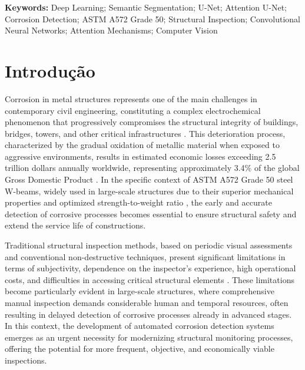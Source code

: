 \documentclass[12pt,a4paper,twoside]{article}
\begin{document}
\vspace{1em}

\noindent \textbf{Keywords:} Deep Learning; Semantic Segmentation; U-Net; Attention U-Net; Corrosion Detection; ASTM A572 Grade 50; Structural Inspection; Convolutional Neural Networks; Attention Mechanisms; Computer Vision

\vspace{2em}

\newpage


\section{Introdução}
\label{sec:introducao}

Corrosion in metal structures represents one of the main challenges in contemporary civil engineering, constituting a complex electrochemical phenomenon that progressively compromises the structural integrity of buildings, bridges, towers, and other critical infrastructures \cite{fontana2005corrosion, revie2011uhlig}. This deterioration process, characterized by the gradual oxidation of metallic material when exposed to aggressive environments, results in estimated economic losses exceeding 2.5 trillion dollars annually worldwide, representing approximately 3.4\% of the global Gross Domestic Product \cite{koch2016cost}. In the specific context of ASTM A572 Grade 50 steel W-beams, widely used in large-scale structures due to their superior mechanical properties and optimized strength-to-weight ratio \cite{astm2018a572}, the early and accurate detection of corrosive processes becomes essential to ensure structural safety and extend the service life of constructions.

Traditional structural inspection methods, based on periodic visual assessments and conventional non-destructive techniques, present significant limitations in terms of subjectivity, dependence on the inspector's experience, high operational costs, and difficulties in accessing critical structural elements \cite{melchers2018structural}. These limitations become particularly evident in large-scale structures, where comprehensive manual inspection demands considerable human and temporal resources, often resulting in delayed detection of corrosive processes already in advanced stages. In this context, the development of automated corrosion detection systems emerges as an urgent necessity for modernizing structural monitoring processes, offering the potential for more frequent, objective, and economically viable inspections.
\end{document}
